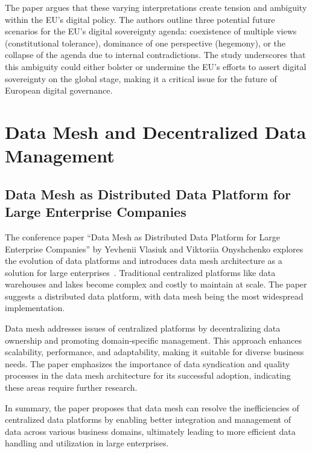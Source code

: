 The paper argues that these varying interpretations create tension and ambiguity within the EU's digital policy.
The authors outline three potential future scenarios for the EU's digital sovereignty agenda: coexistence of multiple views (constitutional tolerance), dominance of one perspective (hegemony), or the collapse of the agenda due to internal contradictions.
The study underscores that this ambiguity could either bolster or undermine the EU's efforts to assert digital sovereignty on the global stage, making it a critical issue for the future of European digital governance.

\section{Data Mesh and Decentralized Data Management}\label{sec:data-mesh-and-decentralized-data-management}

\subsection{Data Mesh as Distributed Data Platform for Large Enterprise Companies}\label{subsec:data-mesh-as-distributed-data-platform-for-large-enterprise-companies}

The conference paper ``Data Mesh as Distributed Data Platform for Large Enterprise Companies'' by Yevhenii Vlasiuk and Viktoriia Onyshchenko explores the evolution of data platforms and introduces data mesh architecture as a solution for large enterprises~\cite{data_mesh}.
Traditional centralized platforms like data warehouses and lakes become complex and costly to maintain at scale.
The paper suggests a distributed data platform, with data mesh being the most widespread implementation.

Data mesh addresses issues of centralized platforms by decentralizing data ownership and promoting domain-specific management.
This approach enhances scalability, performance, and adaptability, making it suitable for diverse business needs.
The paper emphasizes the importance of data syndication and quality processes in the data mesh architecture for its successful adoption, indicating these areas require further research.

In summary, the paper proposes that data mesh can resolve the inefficiencies of centralized data platforms by enabling better integration and management of data across various business domains, ultimately leading to more efficient data handling and utilization in large enterprises.

